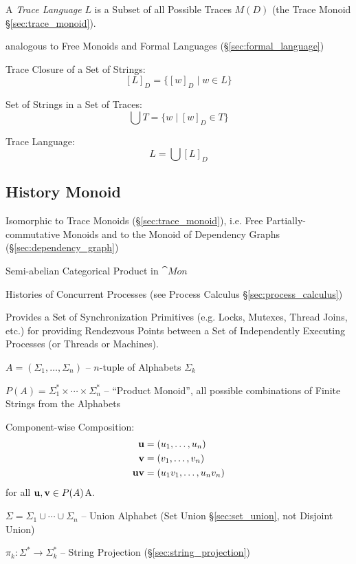 A \emph{Trace Language} $L$ is a Subset of all Possible Traces $M(D)$
(the Trace Monoid \S\ref{sec:trace_monoid}).

analogous to Free Monoids and Formal Languages
(\S\ref{sec:formal_language})

Trace Closure of a Set of Strings:
\[
  [L]_D = \{[w]_D \mid w \in L\}
\]

Set of Strings in a Set of Traces:
\[
  \bigcup T = \{w \mid [w]_D \in T\}
\]

Trace Language:
\[
  L = \bigcup [L]_D
\]



\subsection{History Monoid}\label{sec:history_monoid}

Isomorphic to Trace Monoids (\S\ref{sec:trace_monoid}), i.e. Free
Partially-commutative Monoids and to the Monoid of Dependency Graphs
(\S\ref{sec:dependency_graph})

Semi-abelian Categorical Product in $\cat{Mon}$

Histories of Concurrent Processes (see Process Calculus
\S\ref{sec:process_calculus})

Provides a Set of Synchronization Primitives (e.g. Locks, Mutexes,
Thread Joins, etc.) for providing Rendezvous Points between a Set of
Independently Executing Processes (or Threads or Machines).

$A = (\Sigma_1, \ldots, \Sigma_n)$ -- $n$-tuple of Alphabets
$\Sigma_k$

$P(A) = \Sigma_1^* \times \cdots \times \Sigma_n^*$ -- ``Product
Monoid'', all possible combinations of Finite Strings from the
Alphabets %

Component-wise Composition:
\begin{align*}
  \mathbf{u} &= (u_1, \ldots, u_n) \\
  \mathbf{v} &= (v_1, \ldots, v_n) \\
  \mathbf{uv} &= (u_1 v_1, \ldots, u_n v_n)
\end{align*}
for all $\mathbf{u},\mathbf{v} \in P(A)$A.

$\Sigma = \Sigma_1 \cup \cdots \cup \Sigma_n$ -- Union Alphabet (Set
Union \S\ref{sec:set_union}, not Disjoint Union)

$\pi_k : \Sigma^* \rightarrow \Sigma_k^*$ -- String Projection
(\S\ref{sec:string_projection})

